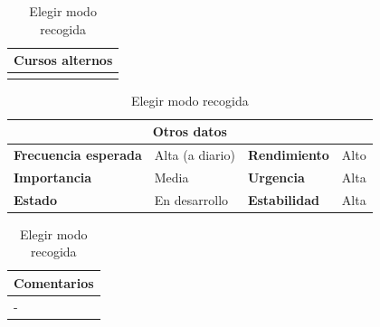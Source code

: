 \documentclass[12pt,spanish]{article}
\begin{document}
\begin{table}[H]
\vspace{1cm}

\begin{tabular}{|m{10pt}|m{7.15cm}|m{10pt}|m{7.15cm}|}
\hline
\multicolumn{4}{|m{16.2cm}|}{\textbf{Cursos alternos}} \\
\hline
\\
\hline
\end{tabular}

\vspace{1cm}

\begin{tabular}{|m{3.72cm}|m{3.72cm}|m{3.72cm}|m{3.72cm}|}
\hline
\multicolumn{4}{|c|}{\textbf{Otros datos}} \\
\hline
\textbf{Frecuencia esperada} & Alta (a diario) & \textbf{Rendimiento} & Alto \\
\hline
\textbf{Importancia} & Media & \textbf{Urgencia} & Alta \\
\hline
\textbf{Estado} & En desarrollo & \textbf{Estabilidad} & Alta \\
\hline
\end{tabular}

\vspace{1cm}

\begin{tabular}{|m{16.2cm}|}
\hline
\textbf{Comentarios} \\
\hline
- \\
\hline
\end{tabular}

\caption{Elegir modo recogida}

\end{table}


\end{document}
